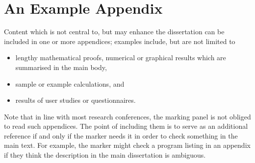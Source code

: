 \documentclass[ oneside,%
                    author={Joshua Felmeden},
                    degree={MEng},
                     title={Semantic Analysis of Financial Headlines Based on Realised Stock Returns},
                  subtitle={}]{dissertation}
\begin{document}
\backmatter





\appendix

\chapter{An Example Appendix}
\label{appx:example}

Content which is not central to, but may enhance the dissertation can be 
included in one or more appendices; examples include, but are not limited
to

\begin{itemize}
\item lengthy mathematical proofs, numerical or graphical results which 
      are summarised in the main body,
\item sample or example calculations, 
      and
\item results of user studies or questionnaires.
\end{itemize}

\noindent
Note that in line with most research conferences, the marking panel is not
obliged to read such appendices. The point of including them is to serve as
an additional reference if and only if the marker needs it in order to check
something in the main text. For example, the marker might check a program listing 
in an appendix if they think the description in the main dissertation is ambiguous.

\end{document}
